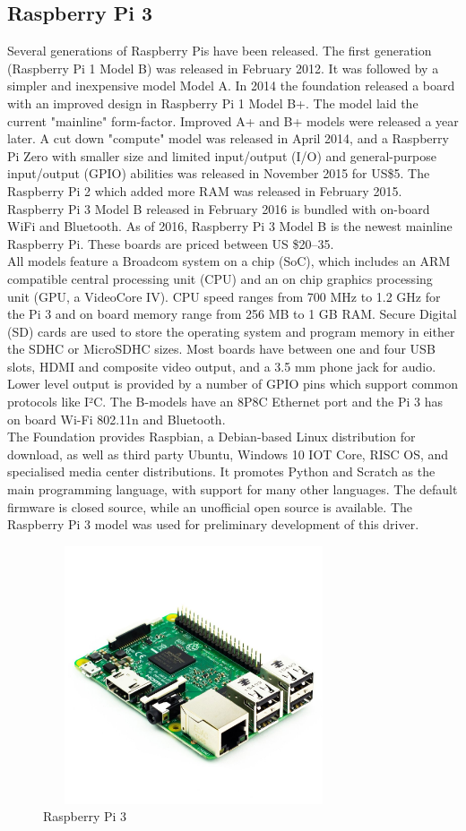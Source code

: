 \subsection{Raspberry Pi 3}
Several generations of Raspberry Pis have been released. The first generation (Raspberry Pi 1 Model B) was released in February 2012. It was followed by a simpler and inexpensive model Model A. In 2014 the foundation released a board with an improved design in Raspberry Pi 1 Model B+. The model laid the current "mainline" form-factor. Improved A+ and B+ models were released a year later. A cut down "compute" model was released in April 2014, and a Raspberry Pi Zero with smaller size and limited input/output (I/O) and general-purpose input/output (GPIO) abilities was released in November 2015 for US\$5. The Raspberry Pi 2 which added more RAM was released in February 2015. Raspberry Pi 3 Model B released in February 2016 is bundled with on-board WiFi and Bluetooth. As of 2016, Raspberry Pi 3 Model B is the newest mainline Raspberry Pi. These boards are priced between US \$20–35.\\
All models feature a Broadcom system on a chip (SoC), which includes an ARM compatible central processing unit (CPU) and an on chip graphics processing unit (GPU, a VideoCore IV). CPU speed ranges from 700 MHz to 1.2 GHz for the Pi 3 and on board memory range from 256 MB to 1 GB RAM. Secure Digital (SD) cards are used to store the operating system and program memory in either the SDHC or MicroSDHC sizes. Most boards have between one and four USB slots, HDMI and composite video output, and a 3.5 mm phone jack for audio. Lower level output is provided by a number of GPIO pins which support common protocols like I²C. The B-models have an 8P8C Ethernet port and the Pi 3 has on board Wi-Fi 802.11n and Bluetooth.\\
The Foundation provides Raspbian, a Debian-based Linux distribution for download, as well as third party Ubuntu, Windows 10 IOT Core, RISC OS, and specialised media center distributions. It promotes Python and Scratch as the main programming language, with support for many other languages. The default firmware is closed source, while an unofficial open source is available.
The Raspberry Pi 3 model was used for preliminary development of this driver.
\begin{figure}[H]
	\centering
	\includegraphics[width=3.5in, height=3in]{images/raspberry_pi.png}
	\caption{Raspberry Pi 3}
\end{figure}
